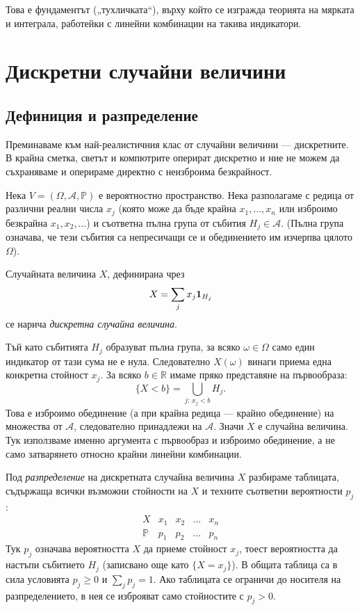 Това е фундаментът („тухличката“), върху който се изгражда теорията на мярката и интеграла, работейки с линейни комбинации на такива индикатори.

\section{Дискретни случайни величини}\label{sec:discrete-random-variables}

\subsection{Дефиниция и разпределение}
Преминаваме към най-реалистичния клас от случайни величини — дискретните. В крайна сметка, светът и компютрите оперират дискретно и ние не можем да съхраняваме и оперираме директно с неизброима безкрайност.

Нека $V = (\Omega, \mathcal{A}, \mathbb{P})$ е вероятностно пространство. Нека разполагаме с редица от различни реални числа $x_j$ (която може да бъде крайна $x_1, \dots, x_n$ или изброимо безкрайна $x_1, x_2, \dots$) и съответна пълна група от събития $H_j \in \mathcal{A}$. (Пълна група означава, че тези събития са непресичащи се и обединението им изчерпва цялото $\Omega$).

\begin{defn}
Случайната величина $X$, дефинирана чрез
\[ X = \sum_{j} x_j \mathbf{1}_{H_j} \]
се нарича \emph{дискретна случайна величина}.
\end{defn}

Тъй като събитията $H_j$ образуват пълна група, за всяко $\omega \in \Omega$ само един индикатор от тази сума не е нула. Следователно $X(\omega)$ винаги приема една конкретна стойност $x_j$. За всяко $b\in\mathbb{R}$ имаме пряко представяне на първообраза:
\[
\{X<b\}=\bigcup_{j:\,x_j<b}H_j.
\]
Това е изброимо обединение (а при крайна редица — крайно обединение) на множества от $\mathcal{A}$, следователно принадлежи на $\mathcal{A}$. Значи $X$ е случайна величина. Тук използваме именно аргумента с първообраз и изброимо обединение, а не само затварянето относно крайни линейни комбинации.

\begin{defn}
Под \emph{разпределение} на дискретната случайна величина $X$ разбираме таблицата, съдържаща всички възможни стойности на $X$ и техните съответни вероятности $p_j$:
\[
\begin{array}{c|c|c|c|c}
X & x_1 & x_2 & \dots & x_n \\
\hline
\mathbb{P} & p_1 & p_2 & \dots & p_n
\end{array}
\]
Тук $p_j$ означава вероятността $X$ да приеме стойност $x_j$, тоест вероятността да настъпи събитието $H_j$ (записвано още като $\{X = x_j\}$). В общата таблица са в сила условията $p_j \ge 0$ и $\sum_j p_j = 1$. Ако таблицата се ограничи до носителя на разпределението, в нея се изброяват само стойностите с $p_j>0$.
\end{defn}

